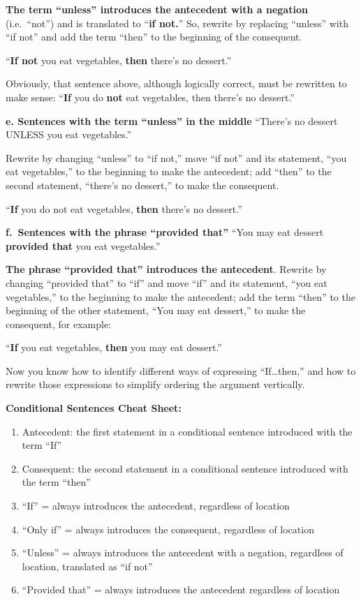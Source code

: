 \documentclass[
]{book}
\providecommand{\tightlist}{%
  \setlength{\itemsep}{0pt}\setlength{\parskip}{0pt}}
\begin{document}
\textbf{The term ``unless'' introduces the antecedent with a negation} (i.e.~``not'') and is translated to ``\textbf{if not.}'' So, rewrite by replacing ``unless'' with ``if not'' and add the term ``then'' to the beginning of the consequent.

``\textbf{If not} you eat vegetables, \textbf{then} there's no dessert.''

Obviously, that sentence above, although logically correct, must be rewritten to make sense:
``\textbf{If} you do \textbf{not} eat vegetables, then there's no dessert.''

\textbf{e. Sentences with the term ``unless'' in the middle}
``There's no dessert UNLESS you eat vegetables.''

Rewrite by changing ``unless'' to ``if not,'' move ``if not'' and its statement, ``you eat vegetables,'' to the beginning to make the antecedent; add ``then'' to the second statement, ``there's no dessert,'' to make the consequent.

``\textbf{If} you do not eat vegetables, \textbf{then} there's no dessert.''

\textbf{f.~Sentences with the phrase ``provided that''}
``You may eat dessert \textbf{provided that} you eat vegetables.''

\textbf{The phrase ``provided that'' introduces the antecedent}. Rewrite by changing ``provided that'' to ``if'' and move ``if'' and its statement, ``you eat vegetables,'' to the beginning to make the antecedent; add the term ``then'' to the beginning of the other statement, ``You may eat dessert,'' to make the consequent, for example:

``\textbf{If} you eat vegetables, \textbf{then} you may eat dessert.''

Now you know how to identify different ways of expressing ``If\ldots then,'' and how to rewrite those expressions to simplify ordering the argument vertically.

\textbf{Conditional Sentences Cheat Sheet:}

\begin{enumerate}
\def\labelenumi{\arabic{enumi}.}
\tightlist
\item
  Antecedent: the first statement in a conditional sentence introduced with the term ``If''\\
\item
  Consequent: the second statement in a conditional sentence introduced with the term ``then''\\
\item
  ``If'' = always introduces the antecedent, regardless of location\\
\item
  ``Only if'' = always introduces the consequent, regardless of location\\
\item
  ``Unless'' = always introduces the antecedent with a negation, regardless of location, translated as ``if not''\\
\item
  ``Provided that'' = always introduces the antecedent regardless of location
\end{enumerate}
\end{document}
